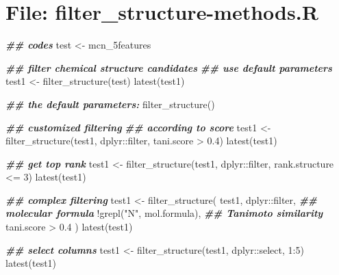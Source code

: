 \documentclass[
]{article}
\newenvironment{Shaded}{\begin{snugshade}}{\end{snugshade}}
\newcommand{\DecValTok}[1]{\textcolor[rgb]{0.00,0.00,0.81}{#1}}
\newcommand{\DocumentationTok}[1]{\textcolor[rgb]{0.56,0.35,0.01}{\textbf{\textit{#1}}}}
\newcommand{\FloatTok}[1]{\textcolor[rgb]{0.00,0.00,0.81}{#1}}
\newcommand{\FunctionTok}[1]{\textcolor[rgb]{0.00,0.00,0.00}{#1}}
\newcommand{\NormalTok}[1]{#1}
\newcommand{\OtherTok}[1]{\textcolor[rgb]{0.56,0.35,0.01}{#1}}
\newcommand{\SpecialCharTok}[1]{\textcolor[rgb]{0.00,0.00,0.00}{#1}}
\newcommand{\StringTok}[1]{\textcolor[rgb]{0.31,0.60,0.02}{#1}}
\begin{document}
\hypertarget{file-filter_structure-methods.r}{%
\section{File: filter\_structure-methods.R}\label{file-filter_structure-methods.r}}

\begin{Shaded}
\begin{Highlighting}[]
\DocumentationTok{\#\# codes}
\NormalTok{test }\OtherTok{\textless{}{-}}\NormalTok{ mcn\_5features}

\DocumentationTok{\#\# filter chemical structure candidates}
\DocumentationTok{\#\# use default parameters}
\NormalTok{test1 }\OtherTok{\textless{}{-}} \FunctionTok{filter\_structure}\NormalTok{(test)}
\FunctionTok{latest}\NormalTok{(test1)}

\DocumentationTok{\#\# the default parameters:}
\FunctionTok{filter\_structure}\NormalTok{()}

\DocumentationTok{\#\# customized filtering}
\DocumentationTok{\#\# according to score}
\NormalTok{test1 }\OtherTok{\textless{}{-}} \FunctionTok{filter\_structure}\NormalTok{(test1, dplyr}\SpecialCharTok{::}\NormalTok{filter, tani.score }\SpecialCharTok{\textgreater{}} \FloatTok{0.4}\NormalTok{)}
\FunctionTok{latest}\NormalTok{(test1)}

\DocumentationTok{\#\# get top rank}
\NormalTok{test1 }\OtherTok{\textless{}{-}} \FunctionTok{filter\_structure}\NormalTok{(test1, dplyr}\SpecialCharTok{::}\NormalTok{filter, rank.structure }\SpecialCharTok{\textless{}=} \DecValTok{3}\NormalTok{)}
\FunctionTok{latest}\NormalTok{(test1)}

\DocumentationTok{\#\# complex filtering}
\NormalTok{test1 }\OtherTok{\textless{}{-}} \FunctionTok{filter\_structure}\NormalTok{(}
\NormalTok{  test1, dplyr}\SpecialCharTok{::}\NormalTok{filter,}
  \DocumentationTok{\#\# molecular formula}
  \SpecialCharTok{!}\FunctionTok{grepl}\NormalTok{(}\StringTok{"N"}\NormalTok{, mol.formula),}
  \DocumentationTok{\#\# Tanimoto similarity}
\NormalTok{  tani.score }\SpecialCharTok{\textgreater{}} \FloatTok{0.4}
\NormalTok{)}
\FunctionTok{latest}\NormalTok{(test1)}

\DocumentationTok{\#\# select columns}
\NormalTok{test1 }\OtherTok{\textless{}{-}} \FunctionTok{filter\_structure}\NormalTok{(test1, dplyr}\SpecialCharTok{::}\NormalTok{select, }\DecValTok{1}\SpecialCharTok{:}\DecValTok{5}\NormalTok{)}
\FunctionTok{latest}\NormalTok{(test1)}
\end{Highlighting}
\end{Shaded}
\end{document}
